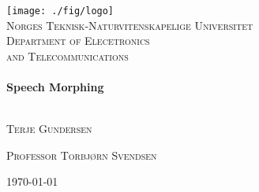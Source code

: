 \begin{titlepage}
 
\begin{center}
 
 
\texttt{[image: ./fig/logo]}\\[1cm]
 
\textsc{\LARGE Norges Teknisk-Naturvitenskapelige Universitet}\\[1.5cm]
 
\textsc{\large Department of Elecetronics \\ and Telecommunications }\\[0.5cm]
 
 
\HRule \\[0.4cm]
{ \huge \bfseries Speech Morphing}\\[0.4cm]
 
\HRule \\[1.5cm]
 
\begin{minipage}{0.45\textwidth}
	\begin{flushleft} \large
		\textsc{Terje Gundersen}
	\end{flushleft}
\end{minipage}
\begin{minipage}{0.45\textwidth}
	\begin{flushright} \large
		\textsc{Professor Torbjørn Svendsen}
	\end{flushright}
\end{minipage}
 
\vfill
 
{\large \today}
 
\end{center}
 
\end{titlepage}
